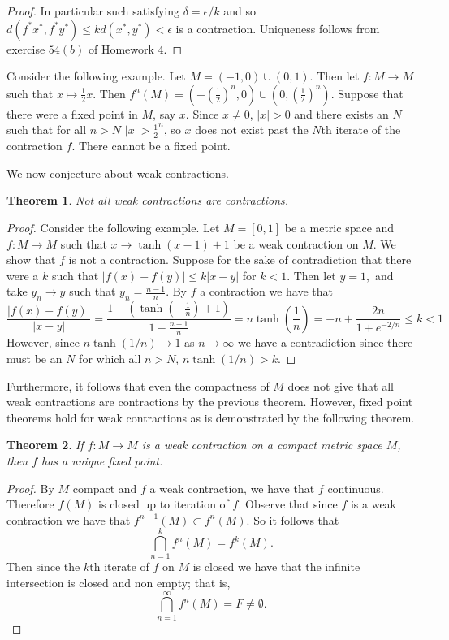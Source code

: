 \documentclass[letter]{article}
\newtheorem{theorem}{Theorem}
\newenvironment{menumerate}{%
  \edef\backupindent{\the\parindent}%
  \enumerate%
  \setlength{\parindent}{\backupindent}%
}{\endenumerate}
\begin{document}
\begin{menumerate}
\begin{proof}
		In particular such satisfying $\delta = \epsilon/k$ and so $d(f^*x^*, f^*y^*) \leq kd(x^*,y^*) < \epsilon$ is a contraction. Uniqueness follows from exercise $54(b)$ of Homework $4$.
	\end{proof}
	\item Consider the following example. Let $M = (-1,0)\cup(0,1).$ Then let $f:M\to M$ such that $x \mapsto \frac12 x.$ Then $f^n(M) = (-(\frac12)^n,0)\cup(0,(\frac12)^n).$
	Suppose that there were a fixed point in $M$, say $x.$ Since $x \neq 0$, $|x| > 0$ and there exists an $N$ such that for all $n>N$ $|x| > \frac12^n$, so $x$ does not exist past the $N$th iterate of the contraction $f$. There cannot be a fixed point.
\item We now conjecture about weak contractions.
\begin{theorem}
 Not all weak contractions are contractions.
\end{theorem}
\begin{proof}
Consider the following example. Let $M = [0,1]$ be a metric space and $f:M\to M$ such that $x \to \tanh(x-1) + 1$ be a weak contraction on $M$. 
We show that $f$ is not a contraction. Suppose for the sake of contradiction that there were a $k$ such that $|f(x) - f(y)| \leq k|x-y|$ for $k < 1$. Then
let $y = 1,$ and take $y_n \to y$ such that $y_n = \frac{n-1}{n}.$ By $f$ a contraction we have that
$$\frac{|f(x)-f(y)|}{|x-y|} = \frac{1- (\tanh(-\frac{1}{n})+1)}{1- \frac{n-1}{n}} = n\tanh\left(\frac{1}{n}\right) = -n + \frac{2n}{1 + e^{-2/n}}\leq k < 1$$
However, since $n\tanh(1/n) \to 1$ as $n\to \infty$ we have a contradiction since there must be an $N$ for which all $n>N$, $n\tanh(1/n) > k$.
\end{proof}

Furthermore, it follows that even the compactness of $M$ does not give that all weak contractions are contractions by the previous theorem. 
However, fixed point theorems hold for weak contractions as is demonstrated by the following theorem.
\begin{theorem}
	If $f: M \to M$ is a weak contraction on a compact metric space $M$, then $f$ has a unique fixed point.
\end{theorem}
\begin{proof}
	By $M$ compact and $f$ a weak contraction, we have that $f$ continuous. Therefore $f(M)$ is closed up to iteration of $f.$ 
	Observe that since $f$ is a weak contraction we have that $f^{n+1}(M) \subset f^n(M).$ So it follows that $$\bigcap_{n=1}^k f^n(M) = f^k(M).$$
	Then since the $k$th iterate of $f$ on $M$ is closed we have that the infinite intersection is closed and non empty; that is,
	 $$\bigcap_{n=1}^\infty f^n(M) = F \neq \emptyset.$$


\end{proof}
\end{menumerate}
\end{document}
